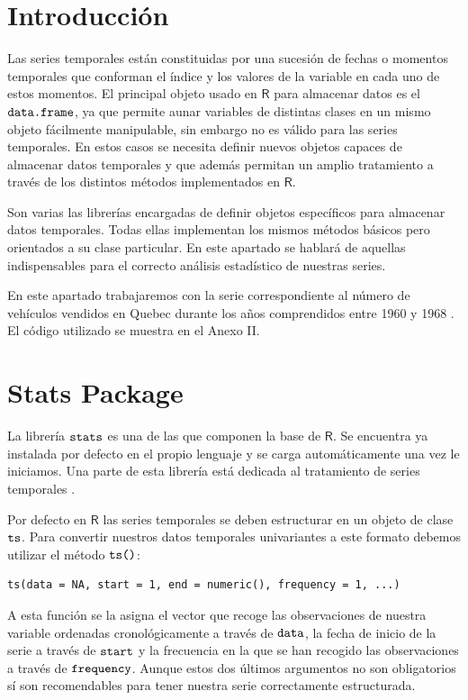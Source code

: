 \setcounter{section}{0}

\section{Introducción}
Las series temporales están constituidas por una sucesión de fechas o momentos temporales que conforman el índice y los valores de la variable en cada uno de estos momentos. El principal objeto usado en $\textsf{R}$ para almacenar datos es el $\verb!data.frame!$, ya que permite aunar variables de distintas clases en un mismo objeto fácilmente manipulable, sin embargo no es válido para las series temporales. En estos casos se necesita definir nuevos objetos capaces de almacenar datos temporales y que además permitan un amplio tratamiento a través de los distintos métodos implementados en $\textsf{R}$.

Son varias las librerías encargadas de definir objetos específicos para almacenar datos temporales. Todas ellas implementan los mismos métodos básicos pero orientados a su clase particular. En este apartado se hablará de aquellas indispensables para el correcto análisis estadístico de nuestras series.

En este apartado trabajaremos con la serie correspondiente al número de vehículos vendidos en Quebec durante los años comprendidos entre 1960 y 1968 \cite{datamarket}. El código utilizado se muestra en el Anexo II.

\section{Stats Package}
La librería $\verb!stats!$ es una de las que componen la base de $\textsf{R}$. Se encuentra ya instalada por defecto en el propio lenguaje y se carga automáticamente una vez le iniciamos. Una parte de esta librería está dedicada al tratamiento de series temporales \cite{stats}.

Por defecto en $\textsf{R}$ las series temporales se deben estructurar en un objeto de clase $\verb!ts!$. Para convertir nuestros datos temporales univariantes a este formato debemos utilizar el método $\verb!ts()!$:
\begin{Verbatim}[fontsize=\footnotesize]
    ts(data = NA, start = 1, end = numeric(), frequency = 1, ...)
\end{Verbatim}

A esta función se la asigna el vector que recoge las observaciones de nuestra variable ordenadas cronológicamente a través de $\verb!data!$, la fecha de inicio de la serie a través de $\verb!start!$ y la frecuencia en la que se han recogido las observaciones a través de $\verb!frequency!$. Aunque estos dos últimos argumentos no son obligatorios sí son recomendables para tener nuestra serie correctamente estructurada.

